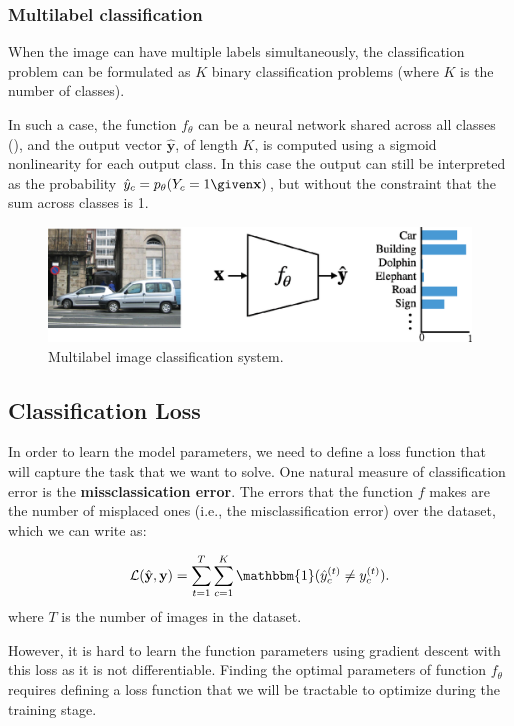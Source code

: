 \subsubsection{Multilabel classification}

When the image can have multiple labels simultaneously, the classification problem can be formulated as $K$ binary classification problems (where $K$ is the number of classes). 

In such a case, the function $f_\theta$ can be a neural network shared across all classes (\fig{\ref{fig:class_architecture}}), and the output vector $\hat{\mathbf{y}}$, of length $K$, is computed using a sigmoid nonlinearity for each output class. In this case the output can still be interpreted as the probability $\hat{y}_c = p_\theta(Y_c=1 \given \mathbf{x})$, but without the constraint that the sum across classes is 1. 


\begin{figure}
\centerline{
\includegraphics[width=0.7\linewidth]{figures/object_recognition/class_architecture.eps}}
\caption{Multilabel image classification system.}
\label{fig:class_architecture}
\end{figure}

\subsection{Classification Loss}

In order to learn the model parameters, we need to define a loss function that will capture the task that we want to solve. One natural measure of classification error is the {\bf missclassication error}. The errors that the function $f$ makes are the number of misplaced ones (i.e., the  misclassification error) over the dataset, which we can write as:

\begin{align}
    \mathcal{L}(\hat{\mathbf{y}},\mathbf{y}) =
    \sum_{t=1}^T \sum_{c=1}^{K}
    \mathbbm{1}(\hat{y}^{(t)}_c \neq y^{(t)}_c ).
\end{align}
where $T$ is the number of images in the dataset.

However, it is hard to learn the function parameters using gradient descent with this loss as it is not differentiable. Finding the optimal parameters of function $f_\theta$ requires defining a loss function that we will be tractable to optimize during the training stage. 

